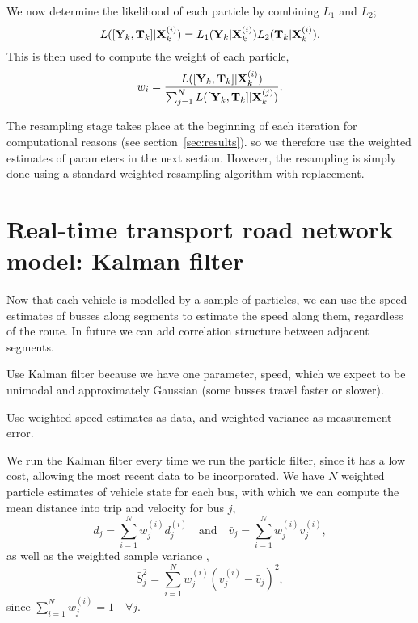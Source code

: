 \documentclass[draftcls,a4paper,onecolumn]{IEEEtran}\usepackage[]{graphicx}\usepackage[]{color}
\begin{document}
We now determine the likelihood of each particle by combining $L_1$ and $L_2$;
\begin{equation}
  \label{eq:particle_likelihood}
  L ([\mathbf{Y}_k, \mathbf{T}_k] | \mathbf{X}_k^{(i)}) = L_1(\mathbf{Y}_k|\mathbf{X}_k^{(i)}) L_2(\mathbf{T}_k | \mathbf{X}_k^{(i)}).
\end{equation}
This is then used to compute the weight of each particle,
\begin{equation}
  \label{eq:particle_weights}
  w_i = \frac{L ([\mathbf{Y}_k, \mathbf{T}_k] | \mathbf{X}_k^{(i)})}{\sum_{j=1}^N   L ([\mathbf{Y}_k, \mathbf{T}_k] | \mathbf{X}_k^{(j)})}.
\end{equation}

The resampling stage takes place at the beginning of each iteration for computational 
reasons (see section~\ref{sec:results}).
so we therefore use the weighted estimates of parameters in the next section.
However, the resampling is simply done using a standard weighted resampling 
algorithm with replacement.


\section{Real-time transport road network model: Kalman filter}
\label{sec:kf}

Now that each vehicle is modelled by a sample of particles,
we can use the speed estimates of busses along segments to estimate
the speed along them, regardless of the route.
In future we can add correlation structure between adjacent segments.

Use Kalman filter because we have one parameter, speed, 
which we expect to be unimodal and approximately Gaussian
(some busses travel faster or slower).

Use weighted speed estimates as data,
and weighted variance as measurement error.


We run the Kalman filter every time we run the particle filter,
since it has a low cost, allowing the most recent data to be incorporated.
We have $N$ weighted particle estimates of vehicle state for each bus,
with which we can compute the mean distance into trip and velocity for bus $j$,
\begin{equation}
  \label{eq:weighted_mean}
  \bar d_j = \sum_{i=1}^N w_j^{(i)} d_j^{(i)} \quad\text{and}\quad
  \bar v_j = \sum_{i=1}^N w_j^{(i)} v_j^{(i)},
\end{equation}
as well as the weighted sample variance \cite{cn},
\begin{equation}
  \label{eq:weighted_variance}
  \bar S_j^2 = \sum_{i=1}^N w_j^{(i)} (v_j^{(i)} - \bar v_j)^2,
\end{equation}
since $\sum_{i=1}^N w_j^{(i)} = 1\quad \forall j$.
\end{document}
